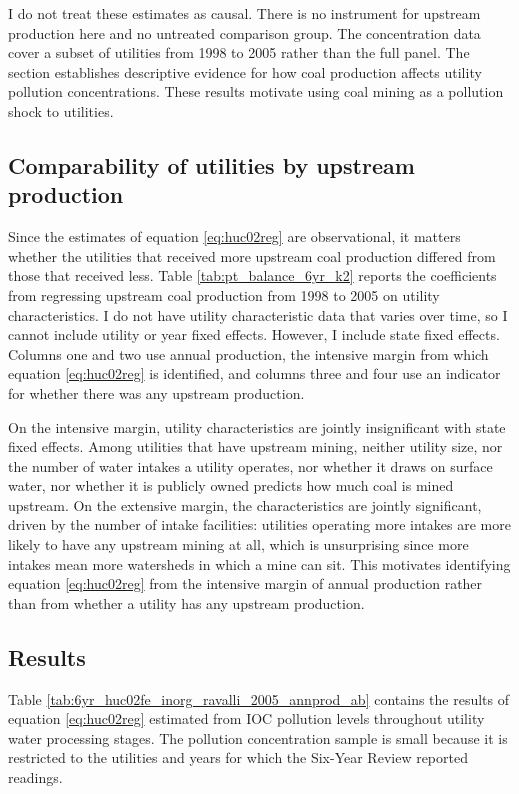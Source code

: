 \documentclass[12pt]{article}
\begin{document}
I do not treat these estimates as causal. There is no instrument for upstream production here and no untreated comparison group. The concentration data cover a subset of utilities from 1998 to 2005 rather than the full panel. The section establishes descriptive evidence for how coal production affects utility pollution concentrations. These results motivate using coal mining as a pollution shock to utilities.

\subsection{Comparability of utilities by upstream production}

Since the estimates of equation \ref{eq:huc02reg} are observational, it matters whether the utilities that received more upstream coal production differed from those that received less. Table \ref{tab:pt_balance_6yr_k2} reports the coefficients from regressing upstream coal production from 1998 to 2005 on utility characteristics. I do not have utility characteristic data that varies over time, so I cannot include utility or year fixed effects. However, I include state fixed effects. Columns one and two use annual production, the intensive margin from which equation \ref{eq:huc02reg} is identified, and columns three and four use an indicator for whether there was any upstream production.

On the intensive margin, utility characteristics are jointly insignificant with state fixed effects. Among utilities that have upstream mining, neither utility size, nor the number of water intakes a utility operates, nor whether it draws on surface water, nor whether it is publicly owned predicts how much coal is mined upstream. On the extensive margin, the characteristics are jointly significant, driven by the number of intake facilities: utilities operating more intakes are more likely to have any upstream mining at all, which is unsurprising since more intakes mean more watersheds in which a mine can sit. This motivates identifying equation \ref{eq:huc02reg} from the intensive margin of annual production rather than from whether a utility has any upstream production.

\subsection{Results}

Table \ref{tab:6yr_huc02fe_inorg_ravalli_2005_annprod_ab} contains the results of equation \ref{eq:huc02reg} estimated from IOC pollution levels throughout utility water processing stages. The pollution concentration sample is small because it is restricted to the utilities and years for which the Six-Year Review reported readings. 
\end{document}
